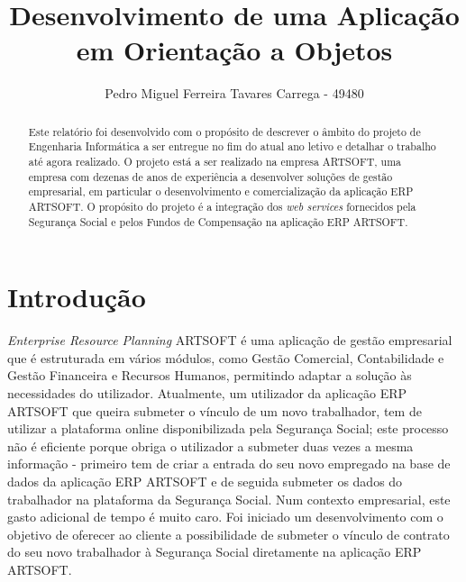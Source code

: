\documentclass[sigplan]{acmart}
\begin{document}
\title{Desenvolvimento de uma Aplicação em Orientação a Objetos}

\author{Pedro Miguel Ferreira Tavares Carrega - 49480}


\renewcommand{\shortauthors}{Pedro Miguel Ferreira Tavares Carrega - 49480}

\begin{abstract}
Este relatório foi desenvolvido com o propósito de descrever o âmbito do projeto de Engenharia Informática a ser entregue no fim do atual ano letivo e detalhar o trabalho até agora realizado. O projeto está a ser realizado na empresa ARTSOFT, uma empresa com dezenas de anos de experiência a desenvolver soluções de gestão empresarial, em particular o desenvolvimento e comercialização da aplicação ERP ARTSOFT. O propósito do projeto é a integração dos \textit{web services} fornecidos pela Segurança Social e pelos Fundos de Compensação na aplicação ERP ARTSOFT.
\end{abstract}


\maketitle

\section{Introdução}

\textit{Enterprise Resource Planning} ARTSOFT é uma aplicação de gestão empresarial que é estruturada em vários módulos, como Gestão Comercial, Contabilidade e Gestão Financeira e Recursos Humanos, permitindo adaptar a solução às necessidades do utilizador. Atualmente, um utilizador da aplicação ERP ARTSOFT que queira submeter o vínculo de um novo trabalhador, tem de utilizar a plataforma online disponibilizada pela Segurança Social; este processo não é eficiente porque obriga o utilizador a submeter duas vezes a mesma informação - primeiro tem de criar a entrada do seu novo empregado na base de dados da aplicação ERP ARTSOFT e de seguida submeter os dados do trabalhador na plataforma da Segurança Social. Num contexto empresarial, este gasto adicional de tempo é muito caro. Foi iniciado um desenvolvimento com o objetivo de oferecer ao cliente a possibilidade de submeter o vínculo de contrato do seu novo trabalhador à Segurança Social diretamente na aplicação ERP ARTSOFT.
\end{document}
